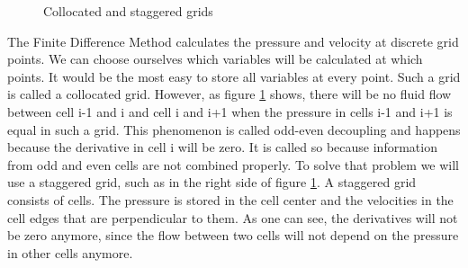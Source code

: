 \documentclass{article}
\begin{document}
\begin{figure}[h]
\centering
{} \caption{Collocated and staggered grids} \label{Odd-even decoupling} \end{figure}
The Finite Difference Method calculates the pressure and velocity at discrete grid points. We can choose ourselves which variables will be calculated at which points. It would be the most easy to store all variables at every point. Such a grid is called a collocated grid\cite{Staggered grid}. However, as figure \ref{Odd-even decoupling} shows, there will be no fluid flow between cell i-1 and i and cell i and i+1 when the pressure in cells i-1 and i+1 is equal in such a grid. This phenomenon is called odd-even decoupling and happens because the derivative in cell i will be zero\cite{Staggered grid}. It is called so because information from odd and even cells are not combined properly\cite{Staggered grid}. To solve that problem we will use a staggered grid, such as in the right side of figure \ref{Odd-even decoupling}. A staggered grid consists of cells. The pressure is stored in the cell center and the velocities in the cell edges that are perpendicular to them\cite{Staggered grid}. As one can see, the derivatives will not be zero anymore, since the flow between two cells will not depend on the pressure in other cells anymore.
\newpage
\end{document}
